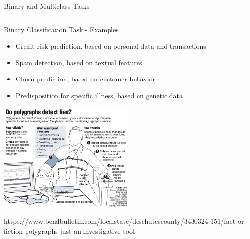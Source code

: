 \documentclass[11pt,compress,t,notes=noshow, xcolor=table]{beamer}
\begin{document}
\begin{vbframe}{Binary and Multiclass Tasks}
\begin{columns}[T]
\begin{column}{0.5\textwidth}
{}




  \end{column}
\end{columns}
\end{vbframe}


\begin{vbframe}{Binary Classification Task - Examples}

  \begin{itemize}
  \item Credit risk prediction, based on personal data and transactions
  \item Spam detection, based on textual features
  \item Churn prediction, based on customer behavior
  \item Predisposition for specific illness, based on genetic data
\end{itemize}

\begin{center}
  \includegraphics[width=0.5\textwidth]{figure_man/lie-detector-polygraph.jpg}
\end{center}
\vspace{-0.6cm}
\begin{flushright}
  \tiny https://www.bendbulletin.com/localstate/deschutescounty/3430324-151/fact-or-fiction-polygraphs-just-an-investigative-tool
\end{flushright}
\end{vbframe}
\end{document}
